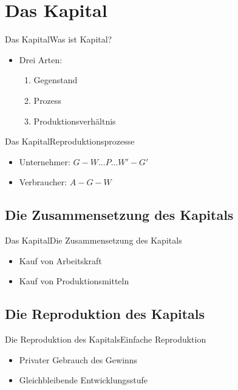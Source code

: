 \documentclass[10pt,a4paper, ngerman]{beamer}
\begin{document}
\section{Das Kapital}
\begin{frame}[fragile]{Das Kapital}{Was ist Kapital?}
\begin{itemize}
	\item Drei Arten:
	\begin{enumerate}
		\item Gegenstand
		\item Prozess
		\item Produktionsverhältnis
	\end{enumerate}
\end{itemize}
\end{frame}

\begin{frame}[fragile]{Das Kapital}{Reproduktionsprozesse}
\begin{itemize}
	\item Unternehmer: \(G - W ... P ... W' - G'\) \pause
	\item Verbraucher: \(A - G - W\)
\end{itemize}
\end{frame}

\subsection{Die Zusammensetzung des Kapitals}
\begin{frame}{Das Kapital}{Die Zusammensetzung des Kapitals}
\begin{itemize}
	\item Kauf von Arbeitskraft 
	\item Kauf von Produktionsmitteln
\end{itemize}
\end{frame}

\subsection{Die Reproduktion des Kapitals}
\begin{frame}{Die Reproduktion des Kapitals}{Einfache Reproduktion}
\begin{itemize}
	\item Privater Gebrauch des Gewinns
	\item Gleichbleibende Entwicklungsstufe
\end{itemize}
\end{frame}
\end{document}
